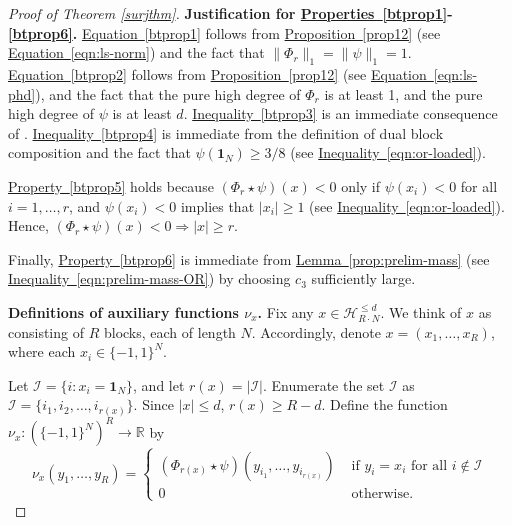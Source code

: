 \documentclass[11pt]{article}
\numberwithin{equation}{section}
\theoremstyle{definition}
\theoremstyle{plain}
\newcommand{\expref}[2]{\hyperref[#2]{#1~\ref{#2}}}
\newcommand{\expeqref}[2]{\hyperref[#2]{#1~\eqref{#2}}}
\newcommand{\reals}{\mathbb{R}}
\newcommand{\bits}{\{-1,1\}}
\newcommand{\ls}{\star}
\newcommand{\Hcal}{\mathcal{H}}
\begin{document}
\begin{proof}[Proof of Theorem \ref{surjthm}]
\medskip  %
	\noindent \textbf{Justification for \expeqref{Properties}{btprop1}-\eqref{btprop6}.} \expeqref{Equation}{btprop1} follows from 
	\expref{Proposition}{prop12} (see \expeqref{Equation}{eqn:ls-norm}) and the fact that $\|\Phi_r\|_1=\|\psi\|_1=1$.
	\expeqref{Equation}{btprop2} follows from \expref{Proposition}{prop12} (see \expeqref{Equation}{eqn:ls-phd}),
	and the fact that the pure high degree of $\Phi_r$ is at least 1, and the pure high degree of 
	$\psi$ is at least $d$.
	\expeqref{Inequality}{btprop3} is an immediate consequence of \cite[Theorem 1]{bt14}.
	\expeqref{Inequality}{btprop4} is immediate from the definition of dual block composition
	and the fact that $\psi(\mathbf{1}_N) \geq 3/8$ (see \expeqref{Inequality}{eqn:or-loaded}). 
	
	\medskip
	\expeqref{Property}{btprop5} holds because $\left(\Phi_r \ls \psi\right)(x) < 0$ only if $\psi(x_i) < 0$ for all $i=1, \dots, r$,
	and $\psi(x_i) < 0$ implies that $|x_i| \geq 1$ (see \expeqref{Inequality}{eqn:or-loaded}). Hence,  $\left(\Phi_r \ls \psi\right)(x) < 0 \Longrightarrow |x| \geq r$.
	
	\medskip
	Finally, 
	\expeqref{Property}{btprop6} is immediate from \expref{Lemma}{prop:prelim-mass} (see \expeqref{Inequality}{eqn:prelim-mass-OR}) by choosing $c_3$ sufficiently large.
	
	\medskip
	\noindent \textbf{Definitions of auxiliary functions $\nu_x$.}
	Fix any $x \in \Hcal_{R \cdot N}^{\leq d}$. We think of $x$ as consisting of $R$ blocks, each of length $N$. Accordingly,  denote 
	$x=(x_1, \dots, x_{R})$, where each $x_i \in \bits^{N}$. 

	Let $\mathcal{I}=\{i \colon x_i = \mathbf{1}_N\}$, and let $r(x)=|\mathcal{I}|$. Enumerate the set $\mathcal{I}$ as $\mathcal{I} = \{i_1, i_2, \dots, i_{r(x)}\}$.
	Since $|x| \leq d$, $r(x) \geq R-d.$ 
	Define the function $\nu_x \colon \left(\bits^{N}\right)^R \to \reals$ by 
	\[
	\nu_x(y_1, \dots, y_R) = 
	\begin{cases}
	(\Phi_{r(x)} \ls \psi)(y_{i_1}, \dots, y_{i_{r(x)}}) & \text{ if } y_i = x_i \text{ for all } i \notin \mathcal{I}\\
	0 & \text{ otherwise}.
	\end{cases} 
	\]
	

\end{proof}
\end{document}
